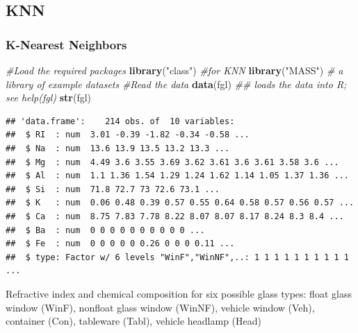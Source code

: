 \documentclass[
  shownotes,
  xcolor={svgnames},
  hyperref={colorlinks,citecolor=DarkBlue,linkcolor=DarkRed,urlcolor=DarkBlue}
  , aspectratio=169]{beamer}
\newenvironment{Shaded}{\begin{snugshade}}{\end{snugshade}}
\newcommand{\CommentTok}[1]{\textcolor[rgb]{0.56,0.35,0.01}{\textit{#1}}}
\newcommand{\KeywordTok}[1]{\textcolor[rgb]{0.13,0.29,0.53}{\textbf{#1}}}
\newcommand{\NormalTok}[1]{#1}
\newcommand{\StringTok}[1]{\textcolor[rgb]{0.31,0.60,0.02}{#1}}
\begin{document}
\subsection{KNN}
\begin{frame}[fragile]
\frametitle{K-Nearest Neighbors}

\begin{scriptsize}
\begin{Shaded}
\begin{Highlighting}[]
\CommentTok{\#Load the required packages}
\KeywordTok{library}\NormalTok{(}\StringTok{"class"}\NormalTok{) }\CommentTok{\#for KNN}
\KeywordTok{library}\NormalTok{(}\StringTok{"MASS"}\NormalTok{) }\CommentTok{\# a library of example datasets}
\CommentTok{\#Read the data}
\KeywordTok{data}\NormalTok{(fgl) }\CommentTok{\#\# loads the data into R; see help(fgl)}
\KeywordTok{str}\NormalTok{(fgl)}
\end{Highlighting}
\end{Shaded}
\end{scriptsize}

\begin{tiny}
\begin{verbatim}
## 'data.frame':    214 obs. of  10 variables:
##  $ RI  : num  3.01 -0.39 -1.82 -0.34 -0.58 ...
##  $ Na  : num  13.6 13.9 13.5 13.2 13.3 ...
##  $ Mg  : num  4.49 3.6 3.55 3.69 3.62 3.61 3.6 3.61 3.58 3.6 ...
##  $ Al  : num  1.1 1.36 1.54 1.29 1.24 1.62 1.14 1.05 1.37 1.36 ...
##  $ Si  : num  71.8 72.7 73 72.6 73.1 ...
##  $ K   : num  0.06 0.48 0.39 0.57 0.55 0.64 0.58 0.57 0.56 0.57 ...
##  $ Ca  : num  8.75 7.83 7.78 8.22 8.07 8.07 8.17 8.24 8.3 8.4 ...
##  $ Ba  : num  0 0 0 0 0 0 0 0 0 0 ...
##  $ Fe  : num  0 0 0 0 0 0.26 0 0 0 0.11 ...
##  $ type: Factor w/ 6 levels "WinF","WinNF",..: 1 1 1 1 1 1 1 1 1 1 ...
\end{verbatim}
\end{tiny}
\begin{tiny}
Refractive index and chemical composition for six possible glass types: float glass window (WinF), nonfloat glass window (WinNF), vehicle window (Veh), container (Con), tableware (Tabl), vehicle headlamp (Head)
\end{tiny}



\end{frame}
\end{document}
